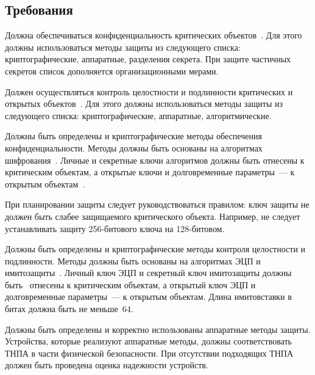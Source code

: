 \subsection{Требования}\label{DP.Reqs}

\label{R.DP.Crit}
Должна обеспечиваться конфиденциальность критических объектов~.
Для этого должны использоваться методы защиты из 
следующего списка: криптографические, аппаратные, разделения секрета.
%
При защите частичных секретов список дополняется организационными мерами.

\label{R.DP.Public}
Должен осуществляться контроль целостности и подлинности критических и открытых
объектов~. Для этого должны использоваться методы защиты из
следующего списка: криптографические, аппаратные, алгоритмические.

\label{R.DP.CryptoE}
Должны быть определены и 
криптографические методы обеспечения конфиденциальности.
%
Методы должны быть основаны на алгоритмах шифрования~.
%
Личные и секретные ключи алгоритмов должны быть отнесены к критическим объектам,
а открытые ключи и долговременные параметры~--- к открытым
объектам~.

\begin{note}
При планировании защиты следует руководствоваться правилом:
ключ защиты не должен быть слабее защищаемого критического объекта. 
%
Например, не следует устанавливать защиту 256-битового ключа на 128-битовом. 
\end{note}

\label{R.DP.CryptoI}
Должны быть определены и  
криптографические методы контроля
целостности и подлинности. Методы должны быть основаны на алгоритмах 
ЭЦП и имитозащиты~.
%
Личный ключ ЭЦП и секретный ключ имитозащиты должны быть~ 
отнесены к критическим объектам, а открытый ключ ЭЦП и долговременные 
параметры~--- к открытым объектам.
%
Длина имитовставки в битах должна быть не меньше~$64$.

\label{R.DP.Hard}
Должны быть определены и корректно использованы аппаратные методы защиты.
Устройства, которые реализуют аппаратные методы, 
должны соответствовать ТНПА в части физической безопасности.
%
При отсутствии подходящих ТНПА должен быть проведена оценка надежности 
устройств.

